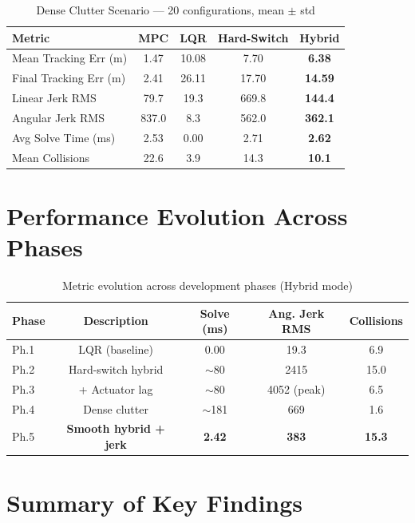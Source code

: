 \documentclass[12pt,a4paper,oneside]{report}
\begin{document}
\begin{table}[!ht]
\centering
\caption{Dense Clutter Scenario — 20 configurations, mean $\pm$ std}
\label{tab:dense20}
\begin{tabular}{lcccc}
\toprule
Metric & MPC & LQR & Hard-Switch & \textbf{Hybrid} \\
\midrule
Mean Tracking Err (m) & 1.47 & 10.08 & 7.70 & \textbf{6.38} \\
Final Tracking Err (m) & 2.41 & 26.11 & 17.70 & \textbf{14.59} \\
Linear Jerk RMS & 79.7 & 19.3 & 669.8 & \textbf{144.4} \\
Angular Jerk RMS & 837.0 & 8.3 & 562.0 & \textbf{362.1} \\
Avg Solve Time (ms) & 2.53 & 0.00 & 2.71 & \textbf{2.62} \\
Mean Collisions & 22.6 & 3.9 & 14.3 & \textbf{10.1} \\
\bottomrule
\end{tabular}
\end{table}

\section{Performance Evolution Across Phases}

\begin{table}[!ht]
\centering
\caption{Metric evolution across development phases (Hybrid mode)}
\label{tab:evolution}
\begin{tabular}{lcccc}
\toprule
Phase & Description & Solve (ms) & Ang. Jerk RMS & Collisions \\
\midrule
Ph.1 & LQR (baseline) & 0.00 & 19.3 & 6.9 \\
Ph.2 & Hard-switch hybrid & $\sim$80 & 2415 & 15.0 \\
Ph.3 & + Actuator lag & $\sim$80 & 4052 (peak) & 6.5 \\
Ph.4 & Dense clutter & $\sim$181 & 669 & 1.6 \\
Ph.5 & \textbf{Smooth hybrid + jerk} & \textbf{2.42} & \textbf{383} & \textbf{15.3} \\
\bottomrule
\end{tabular}
\end{table}

\section{Summary of Key Findings}
\end{document}
